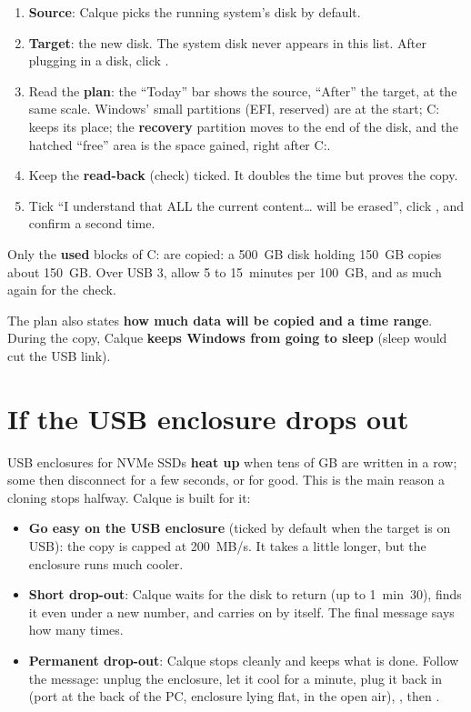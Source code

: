 \begin{enumerate}
\item \textbf{Source}: Calque picks the running system's disk by default.
\item \textbf{Target}: the new disk. The system disk never appears in this list. After plugging in a
      disk, click .
\item Read the \textbf{plan}: the “Today” bar shows the source, “After” the target, at the same scale.
      Windows' small partitions (EFI, reserved) are at the start; C: keeps its place; the
      \textbf{recovery} partition moves to the end of the disk, and the hatched “free” area is the
      space gained, right after C:.
\item Keep the \textbf{read-back} (check) ticked. It doubles the time but proves the copy.
\item Tick “I understand that ALL the current content… will be erased”, click , and confirm
      a second time.
\end{enumerate}


Only the \textbf{used} blocks of C: are copied: a 500~GB disk holding 150~GB copies about 150~GB. Over
USB 3, allow 5 to 15~minutes per 100~GB, and as much again for the check.

The plan also states \textbf{how much data will be copied and a time range}. During the copy,
Calque \textbf{keeps Windows from going to sleep} (sleep would cut the USB link).


\section{If the USB enclosure drops out}\label{sec:decroche}

USB enclosures for NVMe SSDs \textbf{heat up} when tens of GB are written in a row; some then
disconnect for a few seconds, or for good. This is the main reason a cloning stops halfway. Calque is
built for it:

\begin{itemize}
\item \textbf{Go easy on the USB enclosure} (ticked by default when the target is on USB): the copy is
      capped at 200~MB/s. It takes a little longer, but the enclosure runs much cooler.
\item \textbf{Short drop-out}: Calque waits for the disk to return (up to 1~min~30), finds it even under
      a new number, and carries on by itself. The final message says how many times.
\item \textbf{Permanent drop-out}: Calque stops cleanly and keeps what is done. Follow the message:
      unplug the enclosure, let it cool for a minute, plug it back in (port at the back of the PC,
      enclosure lying flat, in the open air), , then .
\end{itemize}

